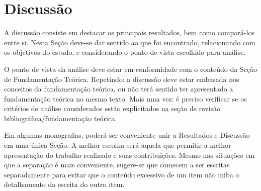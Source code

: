 \chapter{Discussão}
\label{chap:discussao}

A discussão consiste em destacar os principais resultados, bem como compará-los entre si.  Nesta Seção deve-se dar sentido ao que foi encontrado, relacionando com os objetivos do estudo, e considerando o ponto de vista escolhido para análise. 

O ponto de vista da análise deve estar em conformidade com o conteúdo da Seção de Fundamentação Teórica. Repetindo: a discussão deve estar embasada nos conceitos da fundamentação teórica, ou não terá sentido ter apresentado a fundamentação teórica no mesmo texto. Mais uma vez: é preciso verificar se os critérios de análise considerados estão explicitados na seção de revisão bibliográfica/fundamentação teórica.

Em algumas monografias, poderá ser conveniente unir a Resultados e Discussão em uma única Seção. A melhor escolha será aquela que permitir a melhor apresentação do trabalho realizado e suas contribuições. Mesmo nas situações em que a separação é mais conveniente, sugere-se que comecem a ser escritas separadamente para evitar que o conteúdo excessivo de um item não iniba o detalhamento da escrita do outro item.